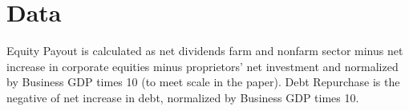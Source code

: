 
\section{Data}
\label{sec:data}

Equity Payout is calculated as net dividends farm and nonfarm sector minus net
increase in corporate equities minus proprietors’ net investment and normalized
by Business GDP times 10 (to meet scale in the paper). Debt Repurchase is the
negative of net increase in debt, normalized by Business GDP times 10.


